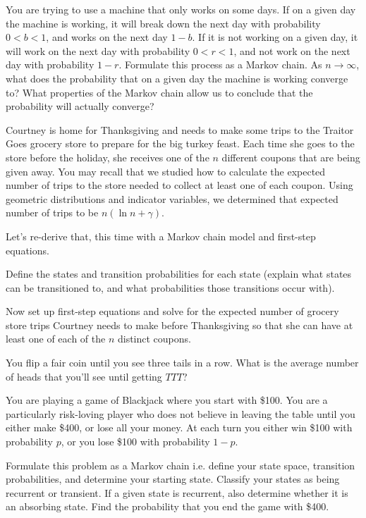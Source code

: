 You are trying to use a machine that only works on some days. If on a given day the machine is working, it will break down the next day with probability $0 < b < 1$, and works on the next day $1 - b$. If it is not working on a given day, it will work on the next day with probability $0 < r < 1$, and not work on the next day with probability $1 - r$. Formulate this process as a Markov chain. As $n \rightarrow \infty$, what does the probability that on a given day the machine is working converge to? What properties of the Markov chain allow us to conclude that the probability will actually converge?


Courtney is home for Thanksgiving and needs to make some trips to the Traitor Goes grocery store to prepare for the big turkey feast. Each time she goes to the store before the holiday, she receives one of the $n$ different coupons that are being given away. You may recall that we studied how to calculate the expected number of trips to the store needed to collect at least one of each coupon. Using geometric distributions and indicator variables, we determined that expected number of trips to be $n(\ln n + \gamma)$.

Let's re-derive that, this time with a Markov chain model and first-step equations. 

\begin{Parts}

\Part Define the states and transition probabilities for each state (explain what states can be transitioned to, and what probabilities those transitions occur with). 

\Part Now set up first-step equations and solve for the expected number of grocery store trips Courtney needs to make before Thanksgiving so that she can have at least one of each of the $n$ distinct coupons.

\end{Parts}



You flip a fair coin until you see three tails in a row. What is the average number of heads that you'll see until getting $TTT$?


You are playing a game of Blackjack where you start with \$100. You are a particularly risk-loving player who does not believe in leaving the table until you either make \$400, or lose all your money. At each turn you either win \$100 with probability $p$, or you lose \$100 with probability $1 - p$.

\begin{Parts}
\Part Formulate this problem as a Markov chain i.e. define your state space, transition probabilities, and determine your starting state.
\Part Classify your states as being recurrent or transient. If a given state is recurrent, also determine whether it is an absorbing state.
\Part Find the probability that you end the game with \$400.
\end{Parts}

